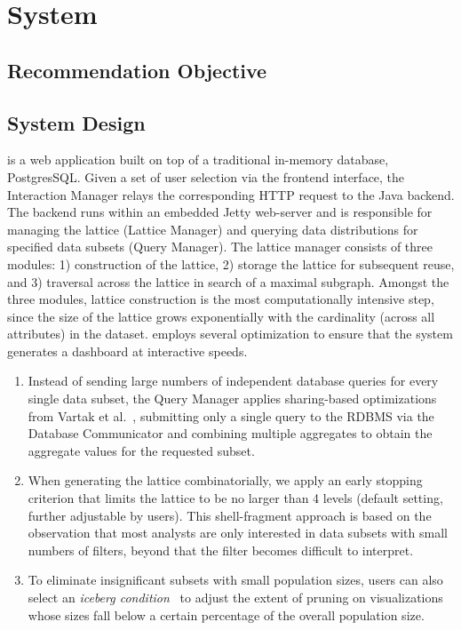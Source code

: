 \section{System}
\subsection{Recommendation Objective}
\subsection{System Design}
\vispilot is a web application built on top of a traditional in-memory database, PostgresSQL. Given a set of user selection via the frontend interface, the Interaction Manager relays the corresponding HTTP request to the Java backend. The backend runs within an embedded Jetty web-server and is responsible for managing the lattice (Lattice Manager) and querying data distributions for specified data subsets (Query Manager). The lattice manager consists of three modules: 1) construction of the lattice, 2) storage the lattice for subsequent reuse, and 3) traversal across the lattice in search of a maximal subgraph. Amongst the three modules, lattice construction is the most computationally intensive step, since the size of the lattice grows exponentially with the cardinality (across all attributes) in the dataset. \vispilot employs several optimization to ensure that the system generates a dashboard at interactive speeds.
\begin{enumerate}
	\item Instead of sending large numbers of independent database queries for every single data subset, the Query Manager applies sharing-based optimizations from Vartak et al.~\cite{Vartak2015}, submitting only a single query to the RDBMS via the Database Communicator and combining multiple aggregates to obtain the aggregate values for the requested subset.
	\item When generating the lattice combinatorially, we apply an early stopping criterion that limits the lattice to be no larger than 4 levels (default setting, further adjustable by users). This shell-fragment approach \cite{Li2004} is based on the observation that most analysts are only interested in data subsets with small numbers of filters, beyond that the filter becomes difficult to interpret. %
	\item To eliminate insignificant subsets with small population sizes, users can also select an \textit{iceberg condition}~\cite{Xin2007} to adjust the extent of pruning on visualizations whose sizes fall below a certain percentage of the overall population size. %
\end{enumerate}
